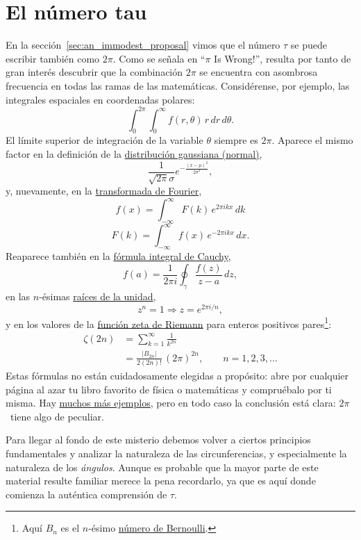 
\section{El número tau} %
\label{sec:the_number_tau}

En la sección~\ref{sec:an_immodest_proposal} vimos que el número $\tau$ se puede escribir también como $2\pi$. Como se señala en ``$\pi$ Is Wrong!'', resulta por tanto de gran interés descubrir que la combinación $2\pi$ se encuentra con asombrosa frecuencia en todas las ramas de las matemáticas. Considérense, por ejemplo, las integrales espaciales en coordenadas polares:
\[
  \int_0^{2\pi}\int_0^\infty f(r, \theta)\, r\, dr\, d\theta.
\]
El límite superior de integración de la variable $\theta$ siempre es $2\pi$. Aparece el mismo factor en la definición de la \href{https://es.wikipedia.org/wiki/Distribución_normal}{distribución gaussiana (normal)},
\[
  \frac{1}{\sqrt{2\pi}\sigma}e^{-\frac{(x-\mu)^2}{2\sigma^2}},
\]
y, nuevamente, en la  \href{http://mathworld.wolfram.com/FourierTransform.html}{transformada de Fourier},
\[
  f(x) = \int_{-\infty}^\infty F(k)\, e^{2\pi ikx}\,dk
\]
\[
    F(k) = \int_{-\infty}^\infty f(x)\, e^{-2\pi ikx}\,dx.
\]
Reaparece también en la \href{https://es.wikipedia.org/wiki/Fórmula_integral_de_Cauchy}{fórmula integral de Cauchy},
\[
  f(a) = \frac{1}{2\pi i}\oint_\gamma\frac{f(z)}{z-a}\,dz,
\]
en las $n$-ésimas \href{https://es.wikipedia.org/wiki/Raíz_de_la_unidad}{raíces de la unidad},
\[
  z^n = 1 \Rightarrow z = e^{2\pi i/n},
\]
y en los valores de la \href{https://es.wikipedia.org/wiki/Función_zeta_de_Riemann}{función zeta de Riemann} para enteros positivos pares\footnote{Aquí $B_n$ es el $n$-ésimo \href{https://es.wikipedia.org/wiki/Número_de_Bernoulli}{número de Bernoulli}.}:
\[
\begin{split}
  \zeta(2n) & = \sum_{k=1}^\infty \frac{1}{k^{2n}} \\
            & = \frac{|B_{2n}|}{2(2n)!}\,(2\pi)^{2n},\qquad n = 1, 2, 3, \ldots
\end{split}
\]
Estas fórmulas no están cuidadosamente elegidas a propósito: abre por cualquier página al azar tu libro favorito de física o matemáticas y compruébalo por ti misma. Hay \href{http://www.harremoes.dk/Peter/Undervis/Turnpage/Turnpage1.html}{muchos más ejemplos}, pero en todo caso la conclusión está clara: $2\pi$~tiene algo de peculiar.

Para llegar al fondo de este misterio debemos volver a ciertos principios fundamentales y analizar la naturaleza de las circunferencias, y especialmente la naturaleza de los \emph{ángulos}. Aunque es probable que la mayor parte de este material resulte familiar merece la pena recordarlo, ya que es aquí donde comienza la auténtica comprensión de $\tau$.

